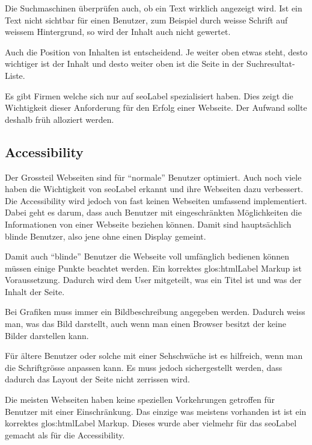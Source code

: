 Die Suchmaschinen überprüfen auch, ob ein Text wirklich angezeigt wird. Ist ein Text nicht sichtbar für einen Benutzer, zum Beispiel durch weisse Schrift auf weissem Hintergrund, so wird der Inhalt auch nicht gewertet.

Auch die Position von Inhalten ist entscheidend. Je weiter oben etwas steht, desto wichtiger ist der Inhalt und desto weiter oben ist die Seite in der Suchresultat-Liste.

Es gibt Firmen welche sich nur auf \gls{seoLabel} spezialisiert haben. Dies zeigt die Wichtigkeit dieser Anforderung für den Erfolg einer Webseite. Der Aufwand sollte deshalb früh alloziert werden.

\subsection{Accessibility}
Der Grossteil Webseiten sind für "`normale"' Benutzer optimiert. Auch noch viele haben die Wichtigkeit von \gls{seoLabel} erkannt und ihre Webseiten dazu verbessert. Die Accessibility wird jedoch von fast keinen Webseiten umfassend implementiert. Dabei geht es darum, dass auch Benutzer mit eingeschränkten Möglichkeiten die Informationen von einer Webseite beziehen können. Damit sind hauptsächlich blinde Benutzer, also jene ohne einen Display gemeint.

Damit auch "`blinde"' Benutzer die Webseite voll umfänglich bedienen können müssen einige Punkte beachtet werden. Ein korrektes \Gls{glos:htmlLabel} Markup ist Voraussetzung. Dadurch wird dem User mitgeteilt, was ein Titel ist und was der Inhalt der Seite.

Bei Grafiken muss immer ein Bildbeschreibung angegeben werden. Dadurch weiss man, was das Bild darstellt, auch wenn man einen Browser besitzt der keine Bilder darstellen kann.

Für ältere Benutzer oder solche mit einer Sehschwäche ist es hilfreich, wenn man die Schriftgrösse anpassen kann. Es muss jedoch sichergestellt werden, dass dadurch das Layout der Seite nicht zerrissen wird.

Die meisten Webseiten haben keine speziellen Vorkehrungen getroffen für Benutzer mit einer Einschränkung. Das einzige was meistens vorhanden ist ist ein korrektes \Gls{glos:htmlLabel} Markup. Dieses wurde aber vielmehr für das \gls{seoLabel} gemacht als für die Accessibility.